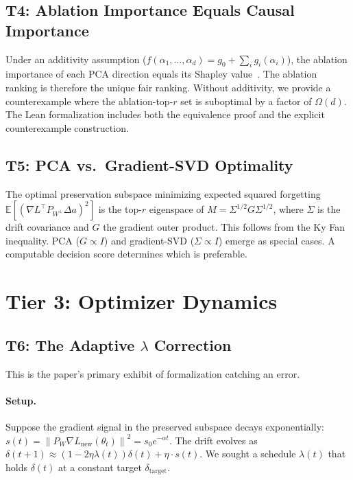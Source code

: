 \documentclass[11pt,a4paper]{article}
\theoremstyle{definition}
\newcommand{\E}{\mathbb{E}}
\newcommand{\proj}[1]{P_{#1}}
\newcommand{\norm}[1]{\left\|#1\right\|}
\begin{document}
\subsection{T4: Ablation Importance Equals Causal Importance}

Under an additivity assumption ($f(\alpha_1, \ldots, \alpha_d) = g_0 + \sum_i g_i(\alpha_i)$), the ablation importance of each PCA direction equals its Shapley value~\citep{shapley1953}. The ablation ranking is therefore the unique fair ranking. Without additivity, we provide a counterexample where the ablation-top-$r$ set is suboptimal by a factor of $\Omega(d)$. The Lean formalization includes both the equivalence proof and the explicit counterexample construction.

\subsection{T5: PCA vs.\ Gradient-SVD Optimality}

The optimal preservation subspace minimizing expected squared forgetting $\E[(\nabla L^\top \proj{W^\perp} \Delta a)^2]$ is the top-$r$ eigenspace of $M = \Sigma^{1/2} G \Sigma^{1/2}$, where $\Sigma$ is the drift covariance and $G$ the gradient outer product. This follows from the Ky Fan inequality. PCA ($G \propto I$) and gradient-SVD ($\Sigma \propto I$) emerge as special cases. A computable decision score determines which is preferable.

\section{Tier 3: Optimizer Dynamics}
\label{sec:tier3}

\subsection{T6: The Adaptive $\lambda$ Correction}
\label{sec:t6}

This is the paper's primary exhibit of formalization catching an error.

\paragraph{Setup.} Suppose the gradient signal in the preserved subspace decays exponentially: $s(t) = \norm{\proj{W}\nabla L_{\mathrm{new}}(\theta_t)}^2 = s_0 e^{-\alpha t}$. The drift evolves as $\delta(t+1) \approx (1 - 2\eta\lambda(t))\delta(t) + \eta \cdot s(t)$. We sought a schedule $\lambda(t)$ that holds $\delta(t)$ at a constant target $\delta_{\mathrm{target}}$.
\end{document}
